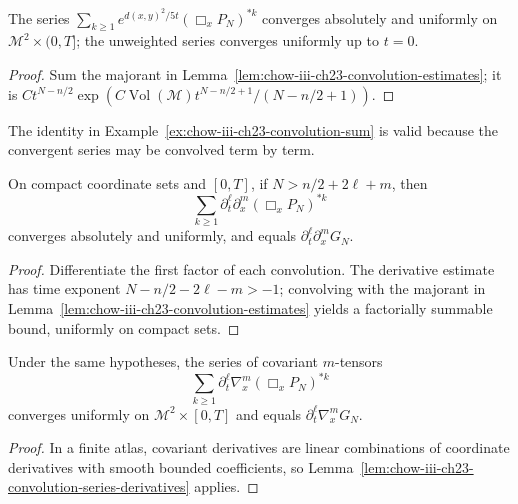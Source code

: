 \begin{corollary}
\label{cor:chow-iii-ch23-convolution-series}
The series $\sum_{k\ge1}e^{d(x,y)^2/5t}(\Box_xP_N)^{*k}$ converges absolutely and
uniformly on $\mathcal M^2\times(0,T]$; the unweighted series converges uniformly
up to $t=0$.
\end{corollary}
\begin{proof}
\sketch Sum the majorant in Lemma~\ref{lem:chow-iii-ch23-convolution-estimates}; it is
\(Ct^{N-n/2}\exp(C\operatorname{Vol}(\mathcal M)t^{N-n/2+1}/(N-n/2+1))\).
\end{proof}

\begin{example}
\label{ex:chow-iii-ch23-convolution-series-commutes}
The identity in Example~\ref{ex:chow-iii-ch23-convolution-sum} is valid because
the convergent series may be convolved term by term.
\end{example}

\begin{lemma}
\label{lem:chow-iii-ch23-convolution-series-derivatives}
On compact coordinate sets and $[0,T]$, if $N>n/2+2\ell+m$, then
\[
\sum_{k\ge1}\partial_t^\ell\partial_x^m(\Box_xP_N)^{*k}
\]
converges absolutely and uniformly, and equals
\(\partial_t^\ell\partial_x^mG_N\).
\end{lemma}
\begin{proof}
\sketch Differentiate the first factor of each convolution.  The derivative estimate
has time exponent $N-n/2-2\ell-m>-1$; convolving with the majorant in
Lemma~\ref{lem:chow-iii-ch23-convolution-estimates} yields a factorially summable
bound, uniformly on compact sets.
\end{proof}

\begin{lemma}
\label{lem:chow-iii-ch23-convolution-series-covariant}
Under the same hypotheses, the series of covariant $m$-tensors
\[
\sum_{k\ge1}\partial_t^\ell\nabla_x^m(\Box_xP_N)^{*k}
\]
converges uniformly on $\mathcal M^2\times[0,T]$ and equals
\(\partial_t^\ell\nabla_x^mG_N\).
\end{lemma}
\begin{proof}
\sketch In a finite atlas, covariant derivatives are linear combinations of coordinate
derivatives with smooth bounded coefficients, so Lemma~\ref{lem:chow-iii-ch23-convolution-series-derivatives} applies.
\end{proof}

